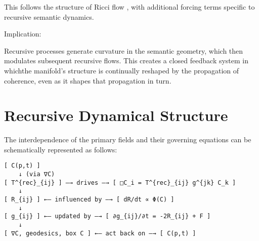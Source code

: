 This follows the structure of Ricci flow \autocite{Hamilton1982, Perelman2002}, with additional forcing terms specific to recursive semantic dynamics.

Implication:

Recursive processes generate curvature in the semantic geometry, which then modulates subsequent recursive flows. This creates a closed feedback system in whichthe manifold's structure is continually reshaped by the propagation of coherence, even as it shapes that propagation in turn.

\section{Recursive Dynamical Structure}

The interdependence of the primary fields and their governing equations can be schematically represented as follows:

\begin{verbatim}
[ C(p,t) ] 
    ↓ (via ∇C)
[ T^{rec}_{ij} ] —→ drives —→ [ □C_i = T^{rec}_{ij} g^{jk} C_k ]
    ↓
[ R_{ij} ] ←— influenced by —→ [ dR/dt ∝ Φ(C) ]
    ↓
[ g_{ij} ] ←— updated by —→ [ ∂g_{ij}/∂t = -2R_{ij} + F ]
    ↓
[ ∇C, geodesics, box C ] ←— act back on —→ [ C(p,t) ]
\end{verbatim} 